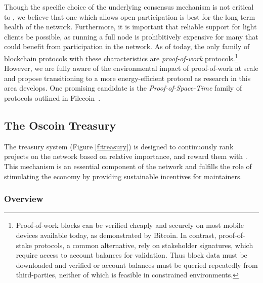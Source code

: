 Though the specific choice of the underlying consensus mechanism is not
critical to \oscoin{}, we believe that one which allows open
participation is best for the long term health of the network. Furthermore,
it is important that reliable support for light clients be possible, as
running a full node is prohibitively expensive for many that could
benefit from participation in the \oscoin{} network. As of today, the only family of
blockchain protocols with these characteristics are \emph{proof-of-work}
protocols.\footnote{Proof-of-work blocks
can be verified cheaply and securely on most mobile devices available
today, as demonstrated by Bitcoin. In contrast, proof-of-stake protocols,
a common alternative, rely on stakeholder signatures, which require access to
account balances for validation. Thus block data must be downloaded and
verified or account balances must be queried repeatedly from third-parties,
neither of which is feasible in constrained environments.} However, we are
fully aware of the environmental impact of proof-of-work at
scale and propose transitioning to a more energy-efficient protocol as research in
this area develops. One promising candidate is the \emph{Proof-of-Space-Time} family of
protocols outlined in Filecoin~\cite{filecoin}.


\begin{figure*}[!ht]
    \par\medskip\noindent\minipage{\linewidth}
    \centering
    
    \caption{The \Oscoin{} Treasury System\label{f:treasury}}
    \endminipage\par\medskip
\end{figure*}

\subsection{The Oscoin Treasury}
\label{s:treasury}

The treasury system (Figure \ref{f:treasury}) is designed to continuously
rank projects on the network based on relative importance, and reward them with
\oscoin{}. This mechanism is an essential component of the network and fulfills the
role of stimulating the economy by providing sustainable incentives for
maintainers.

\subsubsection{Overview}

